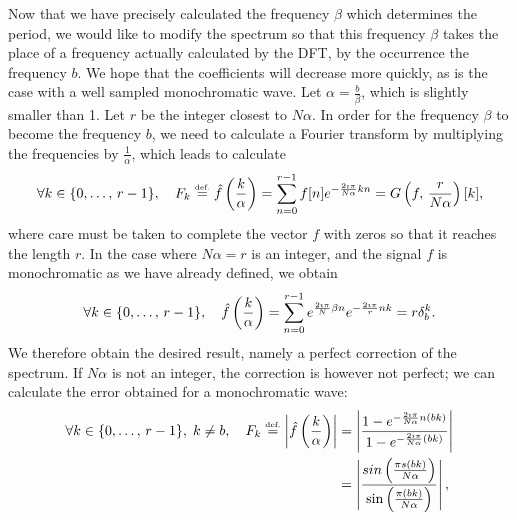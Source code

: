  
Now that we have precisely calculated the frequency $ \beta $ which determines the period, we would like to modify the spectrum so that this frequency $ \beta $ takes the place of a frequency actually calculated by the DFT, by the occurrence the frequency $ b $. We hope that the coefficients will decrease more quickly, as is the case with a well sampled monochromatic wave. Let $ \alpha = \frac{b}{\beta} $, which is slightly smaller than 1. Let $ r $ be the integer closest to $ N \alpha $. In order for the frequency $ \beta $ to become the frequency $ b $, we need to calculate a Fourier transform by multiplying the frequencies by $ \frac{1}{\alpha} $, which leads to calculate
\begin{equation*}
\forall k \in \{0, \ldots, \, r-1 \}, \quad F_k \stackrel{\mbox{\upshape\tiny def.}}{=} \hat{f} \left(\frac{k}{\alpha} \right) = \sum_{n = 0}^{r-1}{f [n] e^{- \frac{2 \imath \pi}{N \alpha} kn}} = G \left(f, \, \frac{r}{N \alpha} \right) [k],
\end{equation*}
where care must be taken to complete the vector $ f $ with zeros so that it reaches the length $ r $. In the case where $ N \alpha = r $ is an integer, and the signal $ f $ is monochromatic as we have already defined, we obtain
\begin{equation*}
\forall k \in \{0, \ldots, \, r-1 \}, \quad \hat{f} \left(\frac{k}{\alpha} \right) = \sum_{n = 0}^{r-1}{e^{\frac{2 \imath \pi}{N} \beta n} e^{- \frac{2 \imath \pi}{r} nk}} = r \delta_b^k.
\end{equation*}
We therefore obtain the desired result, namely a perfect correction of the spectrum. If $ N \alpha $ is not an integer, the correction is however not perfect; we can calculate the error obtained for a monochromatic wave:
\begin{align*}
\forall k \in \{0, \ldots, \, r-1 \}, \; k \neq b, \quad F_k \stackrel{\mbox{\upshape\tiny def.}}{=} \left| \hat{f} \left(\frac{k}{\alpha} \right) \right| & = \left| \frac{1 - e^{- \frac{2 \imath \pi}{N \alpha} n (bk)}}{1 - e^{- \frac{2 \imath \pi}{N \alpha} (bk)}} \right| \\
& = \left| \frac{sin \left(\frac{\pi s (bk)}{N \alpha} \right)}{\sin \left(\frac{\pi (bk)}{N \alpha} \right)} \right|,
\end{align*}

